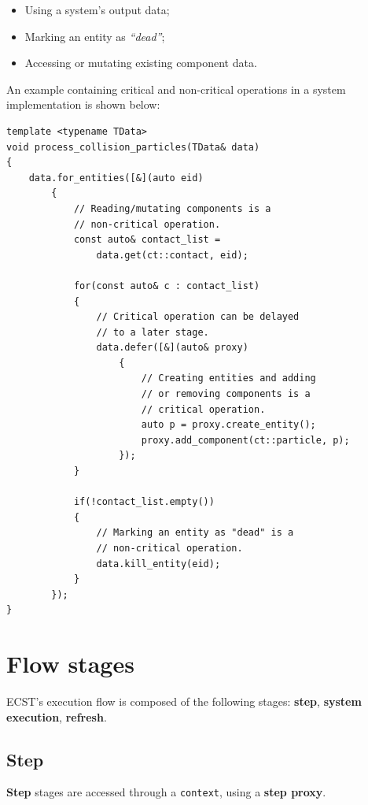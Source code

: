 \documentclass[twoside, 12pt, a4paper, openright]{book}
\begin{document}
\begin{itemize}
\item
  Using a system's output data;
\item
  Marking an entity as \emph{``dead''};
\item
  Accessing or mutating existing component data.
\end{itemize}

An example containing critical and non-critical operations in a system
implementation is shown below:

\begin{verbatim}
template <typename TData>
void process_collision_particles(TData& data)
{
    data.for_entities([&](auto eid)
        {
            // Reading/mutating components is a
            // non-critical operation.
            const auto& contact_list =
                data.get(ct::contact, eid);

            for(const auto& c : contact_list)
            {
                // Critical operation can be delayed
                // to a later stage.
                data.defer([&](auto& proxy)
                    {
                        // Creating entities and adding
                        // or removing components is a
                        // critical operation.
                        auto p = proxy.create_entity();
                        proxy.add_component(ct::particle, p);
                    });
            }

            if(!contact_list.empty())
            {
                // Marking an entity as "dead" is a
                // non-critical operation.
                data.kill_entity(eid);
            }
        });
}
\end{verbatim}

\section{Flow stages}\label{flow-stages}

ECST's execution flow is composed of the following stages:
\textbf{step}, \textbf{system execution}, \textbf{refresh}.

\hypertarget{step_stage}{\subsection{Step}\label{step_stage}}

\textbf{Step} stages are accessed through a
\texttt{context},
using a \textbf{step proxy}.
\end{document}
